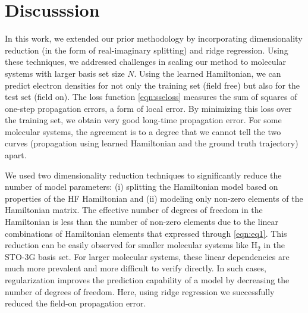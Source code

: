 \documentclass[10pt]{article}
\newcommand{\htwo}{\ensuremath{\text{H}_2} }
\newcommand{\heh}{\ensuremath{\text{HeH}^+} }
\begin{document}







\section{Discusssion}
\label{sec5}
In this work, we extended our prior methodology by incorporating dimensionality reduction (in the form of real-imaginary splitting) and ridge regression.  Using these techniques, we addressed challenges in scaling our method to molecular systems with larger basis set size $N$. Using the learned Hamiltonian, we can predict electron densities for not only the training set (field free) but also for the test set (field on). The loss function \eqref{eqn:sseloss} measures the sum of squares of one-step propagation errors, a form of local error. By minimizing this loss over the training set, we obtain very good long-time propagation error. For some molecular systems, the agreement is to a degree that we cannot tell the two curves (propagation using learned Hamiltonian and the ground truth trajectory) apart.

We used two dimensionality reduction techniques to significantly reduce the number of model parameters: (i) splitting the Hamiltonian model based on properties of the HF Hamiltonian and (ii) modeling only non-zero elements of the Hamiltonian matrix. The effective number of degrees of freedom in the Hamiltonian is less than the number of non-zero elements due to the linear combinations of Hamiltonian elements that  expressed through \eqref{eqn:eq1}. This reduction can be easily observed for smaller molecular systems like \htwo in the STO-3G basis set. For larger molecular systems, these linear dependencies are much more prevalent and more difficult to verify directly. In such cases, regularization improves the prediction capability of a model by decreasing the number of degrees of freedom. Here, using ridge regression we successfully reduced the field-on propagation error.
\end{document}
